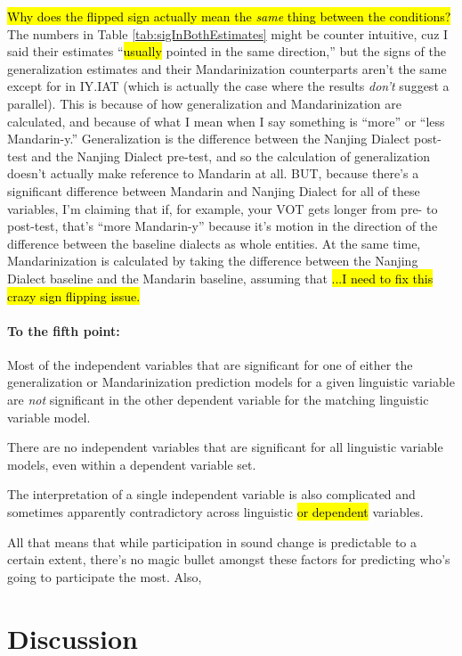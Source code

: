 \hl{Why does the flipped sign actually mean the \emph{same} thing between the conditions?} The numbers in Table \ref{tab:sigInBothEstimates} might be counter intuitive, cuz I said their estimates ``\hl{usually} pointed in the same direction,'' but the signs of the generalization estimates and their Mandarinization counterparts aren't the same except for in IY.IAT (which is actually the case where the results \emph{don't} suggest a parallel). This is because of how generalization and Mandarinization are calculated, and because of what I mean when I say something is ``more'' or ``less Mandarin-y.'' Generalization is the difference between the Nanjing Dialect post-test and the Nanjing Dialect pre-test, and so the calculation of generalization doesn't actually make reference to Mandarin at all. BUT, because there's a significant difference between Mandarin and Nanjing Dialect for all of these variables, I'm claiming that if, for example, your VOT gets longer from pre- to post-test, that's ``more Mandarin-y'' because it's motion in the direction of the difference between the baseline dialects as whole entities. At the same time, Mandarinization is calculated by taking the difference between the Nanjing Dialect baseline and the Mandarin baseline, assuming that \hl{...I need to fix this crazy sign flipping issue.}

\paragraph{To the fifth point:}
Most of the independent variables that are significant for one of either the generalization or Mandarinization prediction models for a given linguistic variable are \emph{not} significant in the other dependent variable for the matching linguistic variable model.

There are no independent variables that are significant for all linguistic variable models, even within a dependent variable set.

The interpretation of a single independent variable is also complicated and sometimes apparently contradictory across linguistic \hl{or dependent} variables.

All that means that while participation in sound change is predictable to a certain extent, there's no magic bullet amongst these factors for predicting who's going to participate the most. Also, 

\section{Discussion}
\label{sec:microcosmDiscussion}

